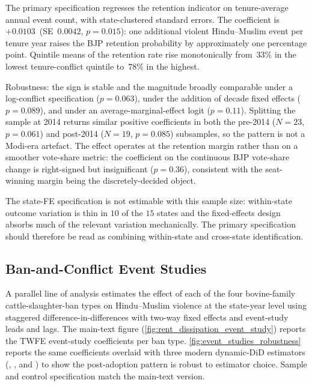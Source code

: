 \documentclass[11pt,twoside]{extarticle}
\begin{document}
The primary specification regresses the retention indicator on
tenure-average annual event count, with state-clustered standard
errors. The coefficient is~$+0.0103$~(SE~$0.0042$, $p=0.015$): one
additional violent Hindu--Muslim event per tenure year raises the BJP
retention probability by approximately one percentage point. Quintile
means of the retention rate rise monotonically from~$33\%$ in the lowest
tenure-conflict quintile to~$78\%$ in the highest.

Robustness: the sign is stable and the magnitude broadly comparable under a
log-conflict specification ($p=0.063$), under the addition of decade fixed
effects ($p=0.089$), and under an average-marginal-effect logit
($p=0.11$). Splitting the sample at 2014 returns similar positive
coefficients in both the pre-2014 ($N=23$, $p=0.061$) and post-2014
($N=19$, $p=0.085$) subsamples, so the pattern is not a Modi-era
artefact. The effect operates at the retention margin rather than on a
smoother vote-share metric: the coefficient on the continuous BJP
vote-share change is right-signed but insignificant ($p=0.36$), consistent
with the seat-winning margin being the discretely-decided object.

The state-FE specification is not estimable with this sample size:
within-state outcome variation is thin in $10$ of the $15$ states and the
fixed-effects design absorbs much of the relevant variation mechanically.
The primary specification should therefore be read as combining
within-state and cross-state identification.

\subsection{Ban-and-Conflict Event Studies} \label{app:event_studies}

A parallel line of analysis estimates the effect of each of the four
bovine-family cattle-slaughter-ban types on Hindu--Muslim violence at the
state-year level using staggered difference-in-differences with two-way
fixed effects and event-study leads and lags. The main-text figure
(\autoref{fig:rent_dissipation_event_study}) reports the TWFE event-study
coefficients per ban type. \autoref{fig:event_studies_robustness} reports
the same coefficients overlaid with three modern dynamic-DiD estimators
(\citet*{cengizEffectMinimumWages2019}, \citet*{gardnerTwostageDifferencesDifferences2022}, and \citet*{liuPracticalGuideCounterfactual2024})
to show the post-adoption pattern is robust to estimator choice. Sample
and control specification match the main-text version.
\end{document}
